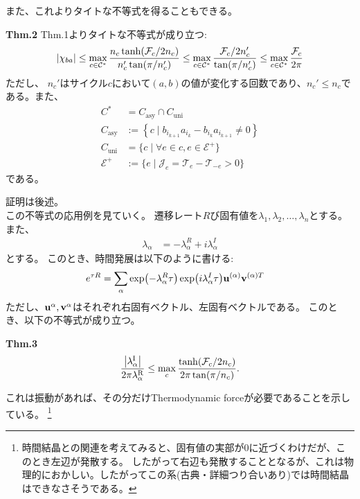 \documentclass[a4paper,11pt]{jsarticle}
\numberwithin{equation}{section}
\begin{document}
また、これよりタイトな不等式を得ることもできる。
\begin{itembox}[l]{\textbf{Thm.2}}
    Thm.1よりタイトな不等式が成り立つ:
    \begin{align}
    \abs{\chi_{ba}}
\leq 
\max_{c \in \mathcal{C}^*}
\frac{n_c \tanh(\mathcal{F}_c / 2n_c)}{n'_c \tan(\pi / n'_c)}
\leq 
\max_{c \in \mathcal{C}^*}
\frac{\mathcal{F}_c / 2n'_c}{\tan(\pi / n'_c)}
\leq 
\max_{c \in \mathcal{C}^*}
\frac{\mathcal{F}_c}{2\pi}
\end{align}
ただし、
$n_c'$はサイクル$c$において$(a,b)$の値が変化する回数であり、$n_c' \leq n_c$である。また、
\begin{align}
    C^* &= C_{\text{asy}} \cap C_{\text{uni}} \\
    C_{\text{asy}} &:= \left\{ c \mid b_{i_{k+1}} a_{i_k} - b_{i_k} a_{i_{k+1}} \neq 0\right\} \\
    C_{\text{uni}} &= \{ c  \mid \forall e \in c, e \in \mathcal{E}^{+} \}\\
    \mathcal{E}^{+} &:= \{ e \mid \mathcal{J}_{e} = \mathcal{T}_e - \mathcal{T}_{-e} > 0 \}
\end{align}
である。
\end{itembox}
証明は後述。\\

この不等式の応用例を見ていく。
遷移レート$R$び固有値を$\lambda_1, \lambda_2, \ldots, \lambda_n$とする。
また、
\begin{align}
    \lambda_{\alpha} &= -\lambda_{\alpha}^{R} + i \lambda_{\alpha}^{I}
\end{align}
とする。
このとき、時間発展は以下のように書ける:
\begin{align}
    e^{\tau R} &= \sum_{\alpha} \exp(-\lambda_{\alpha}^{R} \tau)\exp(i \lambda_{\alpha}^{I} \tau) \vb{u}^{(\alpha)}\vb{v}^{(\alpha) T}
\end{align} 
ただし、$\vb{u}^{\alpha}, \vb{v}^{\alpha}$はそれぞれ右固有ベクトル、左固有ベクトルである。
このとき、以下の不等式が成り立つ。
\begin{itembox}[l]{\textbf{Thm.3}}
    \begin{align}
    \frac{\abs{\lambda_\alpha^{\mathrm{I}}}}{2\pi \lambda_\alpha^{\mathrm{R}}}
    \leq \max_{c} \frac{\tanh(\mathcal{F}_c / 2n_c)}{2\pi \tan(\pi / n_c)}.
\end{align}

\end{itembox}
これは振動があれば、その分だけThermodynamic forceが必要であることを示している。
\footnote{
    時間結晶との関連を考えてみると、固有値の実部が$0$に近づくわけだが、このとき左辺が発散する。
    したがって右辺も発散することとなるが、これは物理的におかしい。したがってこの系(古典・詳細つり合いあり)では時間結晶はできなさそうである。
}
\end{document}
